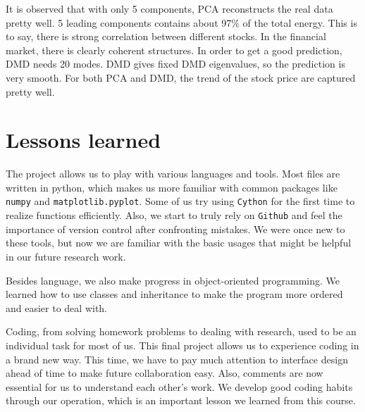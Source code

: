 \documentclass[12pt,a4paper]{article}
\begin{document}
It is  observed that with only 5 components, PCA reconstructs the real data pretty well. 5 leading components contains about 97\% of the total energy. This is to say, there is strong  correlation between different stocks. In the financial market, there is clearly coherent structures. In order to get a good prediction, DMD needs 20 modes. DMD gives fixed DMD eigenvalues, so the prediction is very smooth. For both PCA and DMD, the trend of the stock price are captured pretty well.
\section{Lessons learned}


The project allows us to play with various languages and tools. Most files are written in python, which makes us more familiar with common packages like \texttt{numpy} and \texttt{matplotlib.pyplot}. Some of us try using \texttt{Cython} for the first time to realize functions efficiently. Also, we start to truly rely on \texttt{Github} and feel the importance of version control after confronting mistakes. We were once new to these tools, but now we are familiar with the basic usages that might be helpful in our future research work.

Besides language, we also make progress in object-oriented programming. We learned how to use classes and inheritance to make the program more ordered and easier to deal with. 

Coding, from solving homework problems to dealing with research, used to be an individual task for most of us. This final project allows us to experience coding in a brand new way. This time, we have to pay much attention to interface design ahead of time to make future collaboration easy. Also, comments are now essential for us to understand  each  other's work. We develop good coding habits through our operation, which is an important lesson we learned from this course.



\end{document}
